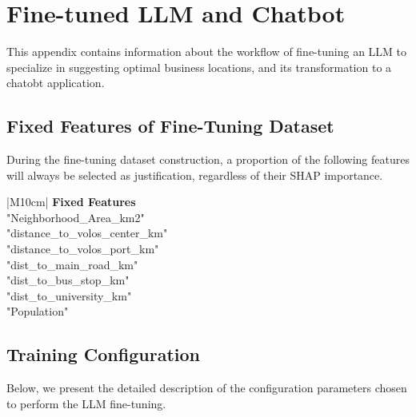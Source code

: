 \chapter{Fine-tuned LLM and Chatbot}

This appendix contains information about the workflow of fine-tuning an LLM to specialize in suggesting optimal business locations, and its transformation to a chatobt application.


\section{Fixed Features of Fine-Tuning Dataset}

During the fine-tuning dataset construction, a proportion of the following features will always be selected as justification, regardless of their SHAP importance.

\begin{table}[ht!]
    \centering
    \begin{tabular}{|M{10cm}|}
        \hline
        \textbf{Fixed Features} \\ \hline
        "Neighborhood\_Area\_km2" \\ \hline
        "distance\_to\_volos\_center\_km" \\ \hline
        "distance\_to\_volos\_port\_km" \\ \hline
        "dist\_to\_main\_road\_km" \\ \hline
        "dist\_to\_bus\_stop\_km" \\ \hline
        "dist\_to\_university\_km" \\ \hline
        "Population" \\ \hline
    \end{tabular}
    \caption{Fixed Fine-Tuning Features}
    \label{tab:fixed_features}
\end{table}



\section{Training Configuration}

Below, we present the detailed description of the configuration parameters chosen to perform the LLM fine-tuning.

